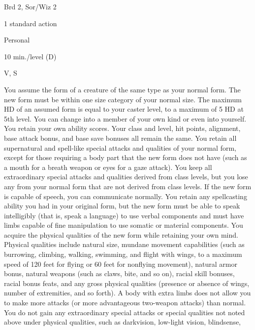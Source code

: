 
\begin{description*}
\item[Level:] Brd 2, Sor/Wiz 2
\item[Casting Time:] 1 standard action
\item[Range:] Personal
\item[Duration:] 10 min./level (D)
\item[Components:] V, S
\end{description*}

You assume the form of a creature of the same type as your normal form. The new
form must be within one size category of your normal size. The maximum HD of an
assumed form is equal to your caster level, to a maximum of 5 HD at 5th level.
You can change into a member of your own kind or even into yourself.
You retain your own ability scores. Your class and level, hit points, alignment,
base attack bonus, and base save bonuses all remain the same. You retain all supernatural
and spell-like special attacks and qualities of your normal form, except for those
requiring a body part that the new form does not have (such as a mouth for a breath
weapon or eyes for a gaze attack).
You keep all extraordinary special attacks and qualities derived from class levels,
but you lose any from your normal form that are not derived from class levels.
If the new form is capable of speech, you can communicate normally. You retain
any spellcasting ability you had in your original form, but the new form must be
able to speak intelligibly (that is, speak a language) to use verbal components
and must have limbs capable of fine manipulation to use somatic or material components.
You acquire the physical qualities of the new form while retaining your own mind.
Physical qualities include natural size, mundane movement capabilities (such as
burrowing, climbing, walking, swimming, and flight with wings, to a maximum speed
of 120 feet for flying or 60 feet for nonflying movement), natural armor bonus,
natural weapons (such as claws, bite, and so on), racial skill bonuses, racial
bonus feats, and any gross physical qualities (presence or absence of wings, number
of extremities, and so forth). A body with extra limbs does not allow you to make
more attacks (or more advantageous two-weapon attacks) than normal.
You do not gain any extraordinary special attacks or special qualities not noted
above under physical qualities, such as darkvision, low-light vision, blindsense,
